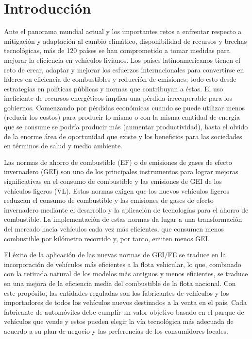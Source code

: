 \chapter{Introducción}

Ante el panorama mundial actual y los importantes retos a enfrentar respecto a mitigación y adaptación al cambio climático, disponibilidad de recursos y brechas tecnológicas, más de 120 países se han comprometido a tomar medidas para mejorar la eficiencia en vehículos livianos. Los países latinoamericanos tienen el reto de crear, adaptar y mejorar los esfuerzos internacionales para convertirse en líderes en eficiencia de combustibles y reducción de emisiones; todo esto desde estrategias en políticas públicas y normas que contribuyan a éstas. El uso ineficiente de recursos energéticos implica una pérdida irrecuperable para los gobiernos. Comenzando por pérdidas económicas cuando se puede utilizar menos (reducir los costos) para producir lo mismo o con la misma cantidad de energía que se consume se podría producir más (aumentar productividad), hasta el olvido de la enorme área de oportunidad que existe y los beneficios para las sociedades en términos de salud y medio ambiente.

Las normas de ahorro de combustible (EF) o de emisiones de gases de efecto invernadero (GEI) son uno de los principales instrumentos para lograr mejoras significativas en el consumo de combustible y las emisiones de GEI de los vehículos ligeros (VL). Estas normas exigen que los nuevos vehículos ligeros reduzcan el consumo de combustible y las emisiones de gases de efecto invernadero mediante el desarrollo y la aplicación de tecnologías para el ahorro de combustible. La implementación de estas normas da lugar a una transformación del mercado hacia vehículos cada vez más eficientes, que consumen menos combustible por kilómetro recorrido y, por tanto, emiten menos GEI. \cite{FESET_ICCT}

El éxito de la aplicación de las nuevas normas de GEI/FE se traduce en la incorporación de vehículos más eficientes a la flota vehicular, lo que, combinado con la retirada natural de los modelos más antiguos y menos eficientes, se traduce en una mejora de la eficiencia media del combustible de la flota nacional. Con este propósito, las entidades reguladas son los fabricantes de vehículos y los importadores de todos los vehículos nuevos destinados a la venta en el país. Cada fabricante de automóviles debe cumplir un valor objetivo basado en el parque de vehículos que vende y estos pueden elegir la vía tecnológica más adecuada de acuerdo a su plan de negocio y las preferencias de los consumidores locales. \cite{FESET_ICCT}

